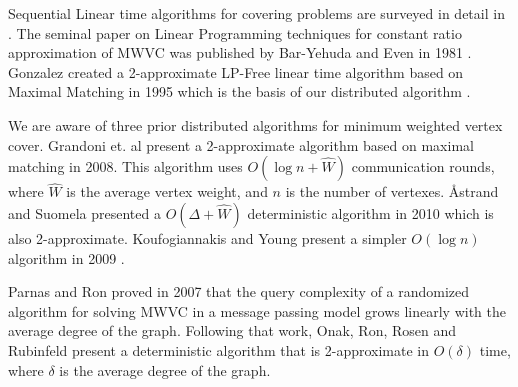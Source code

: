 Sequential Linear time algorithms for covering problems are surveyed in detail in \cite{254190}. The seminal paper on Linear Programming techniques for constant ratio approximation of MWVC was published by Bar-Yehuda and Even in 1981 \cite{Bar-Yehuda:1981lr}. Gonzalez created a 2-approximate LP-Free linear time algorithm based on Maximal Matching in 1995 which is the basis of our distributed algorithm \cite{Gonzalez1995129}. 

We are aware of three prior distributed algorithms for minimum weighted vertex cover. Grandoni et. al present a 2-approximate algorithm based on maximal matching in 2008\cite{1435381}. This algorithm uses $O(\log n + \hat{W})$ communication rounds, where $\hat{W}$ is the average vertex weight, and $n$ is the number of vertexes. {\AA}strand and Suomela presented a $O(\Delta + \hat{W})$ deterministic algorithm in 2010 which is also 2-approximate. Koufogiannakis and Young present a simpler $O(\log n)$ algorithm in 2009 \cite{1582746}. 

Parnas and Ron proved in 2007 that the query complexity of a randomized algorithm for solving MWVC in a message passing model grows linearly with the average degree of the graph\cite{Parnas:2007:AMV:1280283.1280327}. Following that work, Onak, Ron, Rosen and Rubinfeld present a deterministic algorithm that is 2-approximate in $O(\delta)$ time, where $\delta$ is the average degree of the graph\cite{Onak:2012:NSA:2095116.2095204}. 
